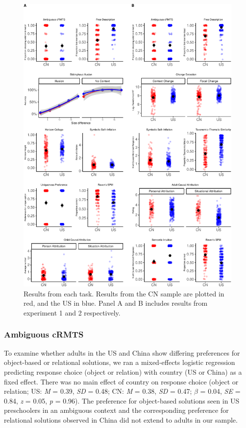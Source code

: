 \documentclass[
  man,floatsintext]{apa6}
\begin{document}
\begin{figure}
\centering
\includegraphics{CCRR_manuscript_files/figure-latex/unnamed-chunk-16-1.pdf}
\caption{\label{fig:unnamed-chunk-16}Results from each task. Results from the CN sample are plotted in red, and the US in blue. Panel A and B includes results from experiment 1 and 2 respectively.}
\end{figure}

\hypertarget{ambiguous-crmts-1}{%
\subsubsection{Ambiguous cRMTS}\label{ambiguous-crmts-1}}

To examine whether adults in the US and China show differing preferences for object-based or relational solutions, we ran a mixed-effects logistic regression predicting response choice (object or relation) with country (US or China) as a fixed effect. There was no main effect of country on response choice (object or relation; US: \emph{M} = 0.39, \emph{SD} = 0.48; CN: \emph{M} = 0.38, \emph{SD} = 0.47; \(\beta\) = 0.04, \emph{SE} = 0.84, \emph{z} = 0.05, \emph{p} = 0.96). The preference for object-based solutions seen in US preschoolers in an ambiguous context and the corresponding preference for relational solutions observed in China did not extend to adults in our sample.
\end{document}
